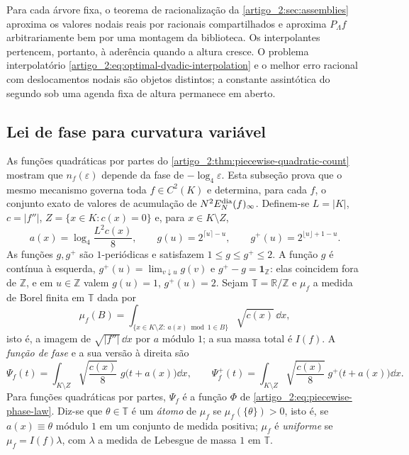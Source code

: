 Para cada árvore fixa, o teorema de racionalização da \cref{artigo_2:sec:assemblies}
aproxima os valores nodais reais por racionais compartilhados e aproxima
$P_\Lambda f$ arbitrariamente bem por uma montagem da biblioteca. Os
interpolantes pertencem, portanto, à aderência quando a altura cresce. O
problema interpolatório \eqref{artigo_2:eq:optimal-dyadic-interpolation} e o melhor
erro racional com deslocamentos nodais são objetos distintos; a constante
assintótica do segundo sob uma agenda fixa de altura permanece em aberto.
\subsection{Lei de fase para curvatura variável}
\label{artigo_2:sec:phase-law}

As funções quadráticas por partes do \cref{artigo_2:thm:piecewise-quadratic-count} mostram que
$n_f(\varepsilon)$ depende da fase de $-\log_4\varepsilon$. Esta subseção prova que
o mesmo mecanismo governa toda $f\in C^2(K)$ e determina, para cada $f$, o
conjunto exato de valores de acumulação de $N^2E_N^{\rm dia}(f)_\infty$.
Definem-se $L=|K|$, $c=|f''|$, $Z=\{x\in K:c(x)=0\}$ e, para $x\in K\setminus Z$,
\begin{equation}
 a(x)=\log_4\frac{L^2c(x)}{8},
 \qquad
 g(u)=2^{\lceil u\rceil-u},
 \qquad
 g^{+}(u)=2^{\lfloor u\rfloor+1-u}.
 \label{artigo_2:eq:phase-kernels}
\end{equation}
As funções $g,g^+$ são $1$-periódicas e satisfazem $1\le g\le g^+\le2$.
A função $g$ é contínua à esquerda, $g^+(u)=\lim_{v\downarrow u}g(v)$ e
$g^+-g=\mathbf 1_{\mathbb Z}$: elas coincidem fora de $\mathbb Z$, e em
$u\in\mathbb Z$ valem $g(u)=1$, $g^+(u)=2$. Sejam $\mathbb T=\mathbb R/\mathbb Z$
e $\mu_f$ a medida de Borel finita em $\mathbb T$ dada por
\[
 \mu_f(B)=\int_{\{x\in K\setminus Z:\ a(x)\bmod1\in B\}}\sqrt{c(x)}\,\dd x,
\]
isto é, a imagem de $\sqrt{|f''|}\,\dd x$ por $a$ módulo $1$; a sua massa
total é $I(f)$. A \emph{função de fase} e a sua versão à direita são
\begin{equation}
 \Psi_f(t)=\int_{K\setminus Z}\sqrt{\frac{c(x)}8}\;g\bigl(t+a(x)\bigr)\dd x,
 \qquad
 \Psi_f^{+}(t)=\int_{K\setminus Z}\sqrt{\frac{c(x)}8}\;g^{+}\bigl(t+a(x)\bigr)\dd x.
 \label{artigo_2:eq:phase-function}
\end{equation}
Para funções quadráticas por partes, $\Psi_f$ é a função $\Phi$ de
\eqref{artigo_2:eq:piecewise-phase-law}. Diz-se que $\theta\in\mathbb T$ é um
\emph{átomo} de $\mu_f$ se $\mu_f(\{\theta\})>0$, isto é, se $a(x)\equiv\theta$
módulo $1$ em um conjunto de medida positiva; $\mu_f$ é \emph{uniforme} se
$\mu_f=I(f)\lambda$, com $\lambda$ a medida de Lebesgue de massa $1$ em $\mathbb T$.

